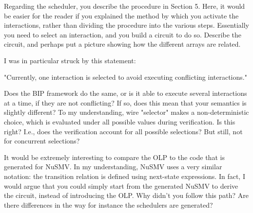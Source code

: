 \done
{}


Regarding the scheduler, you describe the procedure in Section 5. Here, it
would be easier for the reader if you explained the method by which you
activate the interactions, rather than dividing the procedure into the various
steps. Essentially you need to select an interaction, and you build a circuit
to do so. Describe the circuit, and perhaps put a picture showing how the
different arrays are related.
\done
{}

I was in particular struck by this statement:

"Currently, one interaction is selected to avoid executing conflicting
interactions."

Does the BIP framework do the same, or is it able to execute several
interactions at a time, if they are not conflicting? If so, does this mean
that your semantics is slightly different? To my understanding, wire
"selector" makes a non-deterministic choice, which is evaluated under all
possible values during verification. Is this right? I.e., does the
verification account for all possible selections? But still, not for
concurrent selections?

\done
{}


It would be extremely interesting to compare the OLP to the code that is
generated for NuSMV. In my understanding, NuSMV uses a very similar notation:
the transition relation is defined using next-state expressions. In fact, I
would argue that you could simply start from the generated NuSMV to derive the
circuit, instead of introducing the OLP. Why didn't you follow this path? Are
there differences in the way for instance the schedulers are generated?

